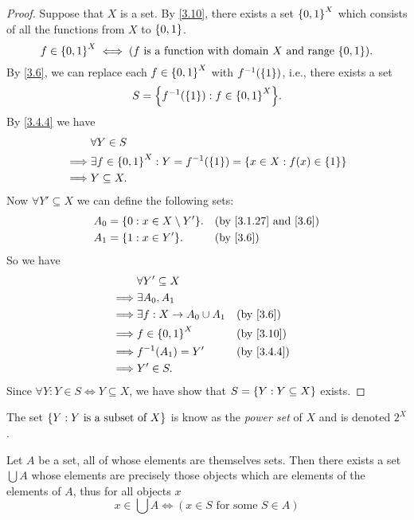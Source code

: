 \begin{proof}
  Suppose that \(X\) is a set.
  By \cref{3.10}, there exists a set \(\left\lbrace0, 1\right\rbrace^X\) which consists of all the functions from \(X\) to \(\left\lbrace0, 1\right\rbrace\).
  \[
    f \in \set{0, 1}^X \iff (f \text{ is a function with domain } X \text{ and range } \set{0, 1}).
  \]
  By \cref{3.6}, we can replace each \(f \in \left\lbrace0, 1\right\rbrace^X\) with \(f^{-1}(\left\lbrace1\right\rbrace)\), i.e., there exists a set
  \[
    S = \set{f^{-1}(\set{1}) : f \in \set{0, 1}^X}.
  \]
  By \cref{3.4.4} we have
  \begin{align*}
             & \forall Y \in S                                                                     \\
    \implies & \exists f \in \left\lbrace0, 1\right\rbrace^X : Y = f^{-1}(\left\lbrace1\right\rbrace) = \left\lbrace x \in X : f(x) \in \left\lbrace1\right\rbrace\right\rbrace \\
    \implies & Y \subseteq X.
  \end{align*}
  Now \(\forall Y' \subseteq X\) we can define the following sets:
  \begin{align*}
    A_0 & = \set{0 : x \in X \setminus Y'}. &  & \text{(by \cref{3.1.27} and \cref{3.6})} \\
    A_1 & = \set{1 : x \in Y'}.             &  & \by{3.6}
  \end{align*}
  So we have
  \begin{align*}
             & \forall Y' \subseteq X                         \\
    \implies & \exists A_0, A_1                               \\
    \implies & \exists f : X \to A_0 \cup A_1 &  & \by{3.6}   \\
    \implies & f \in \set{0, 1}^X             &  & \by{3.10}  \\
    \implies & f^{-1}(A_1) = Y'               &  & \by{3.4.4} \\
    \implies & Y' \in S.
  \end{align*}
  Since \(\forall Y : Y \in S \iff Y \subseteq X\), we have show that \(S = \left\lbrace Y : Y \subseteq X\right\rbrace\) exists.
\end{proof}

\begin{rmk}\label{3.4.10}
  The set \(\left\lbrace Y : Y \text{ is a subset of } X\right\rbrace\) is know as the \emph{power set} of \(X\) and is denoted \(2^X\).
\end{rmk}

\begin{ax}[Union]\label{3.11}
  Let \(A\) be a set, all of whose elements are themselves sets.
  Then there exists a set \(\bigcup A\) whose elements are precisely those objects which are elements of the elements of \(A\), thus for all objects \(x\)
  \[
    x \in \bigcup A \iff (x \in S \text{ for some } S \in A)
  \]
\end{ax}

